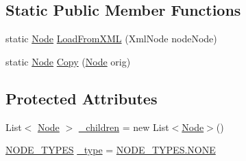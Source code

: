 \subsection*{Static Public Member Functions}
\begin{DoxyCompactItemize}
\item 
static \hyperlink{class_web_analyzer_1_1_models_1_1_settings_model_1_1_expression_tree_1_1_node}{Node} \hyperlink{class_web_analyzer_1_1_models_1_1_settings_model_1_1_expression_tree_1_1_node_a54323c9080efce8ccaac711e191edeec}{Load\+From\+X\+M\+L} (Xml\+Node node\+Node)
\item 
static \hyperlink{class_web_analyzer_1_1_models_1_1_settings_model_1_1_expression_tree_1_1_node}{Node} \hyperlink{class_web_analyzer_1_1_models_1_1_settings_model_1_1_expression_tree_1_1_node_a22898ea14ec232d9b7ef9f77f70e7be1}{Copy} (\hyperlink{class_web_analyzer_1_1_models_1_1_settings_model_1_1_expression_tree_1_1_node}{Node} orig)
\end{DoxyCompactItemize}
\subsection*{Protected Attributes}
\begin{DoxyCompactItemize}
\item 
List$<$ \hyperlink{class_web_analyzer_1_1_models_1_1_settings_model_1_1_expression_tree_1_1_node}{Node} $>$ \hyperlink{class_web_analyzer_1_1_models_1_1_settings_model_1_1_expression_tree_1_1_node_a08c9f3e82b0a8baeac2db82f16266c60}{\+\_\+children} = new List$<$\hyperlink{class_web_analyzer_1_1_models_1_1_settings_model_1_1_expression_tree_1_1_node}{Node}$>$()
\item 
\hyperlink{class_web_analyzer_1_1_models_1_1_settings_model_1_1_expression_tree_1_1_node_a89c72b19ff778cbc04788f4cb47a730e}{N\+O\+D\+E\+\_\+\+T\+Y\+P\+E\+S} \hyperlink{class_web_analyzer_1_1_models_1_1_settings_model_1_1_expression_tree_1_1_node_ad944bafbeb7287e38bc6bc7826752516}{\+\_\+type} = \hyperlink{class_web_analyzer_1_1_models_1_1_settings_model_1_1_expression_tree_1_1_node_a89c72b19ff778cbc04788f4cb47a730eab50339a10e1de285ac99d4c3990b8693}{N\+O\+D\+E\+\_\+\+T\+Y\+P\+E\+S.\+N\+O\+N\+E}
\end{DoxyCompactItemize}
